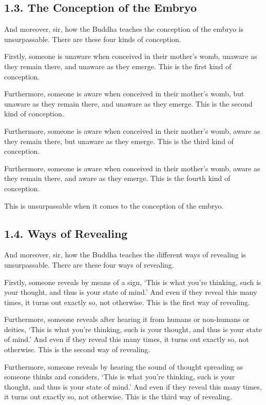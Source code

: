 \documentclass[12pt,openany]{book}%
\begin{document}
\subsection*{1.3. The Conception of the Embryo }

And moreover, sir, how the Buddha teaches the conception of the embryo is unsurpassable. There are these four kinds of conception. 

Firstly, someone is unaware when conceived in their mother’s womb, unaware as they remain there, and unaware as they emerge. This is the first kind of conception. 

Furthermore, someone is aware when conceived in their mother’s womb, but unaware as they remain there, and unaware as they emerge. This is the second kind of conception. 

Furthermore, someone is aware when conceived in their mother’s womb, aware as they remain there, but unaware as they emerge. This is the third kind of conception. 

Furthermore, someone is aware when conceived in their mother’s womb, aware as they remain there, and aware as they emerge. This is the fourth kind of conception. 

This is unsurpassable when it comes to the conception of the embryo. 

\subsection*{1.4. Ways of Revealing }

And moreover, sir, how the Buddha teaches the different ways of revealing is unsurpassable. There are these four ways of revealing. 

Firstly, someone reveals by means of a sign, ‘This is what you’re thinking, such is your thought, and thus is your state of mind.’ And even if they reveal this many times, it turns out exactly so, not otherwise. This is the first way of revealing. 

Furthermore, someone reveals after hearing it from humans or non-humans or deities, ‘This is what you’re thinking, such is your thought, and thus is your state of mind.’ And even if they reveal this many times, it turns out exactly so, not otherwise. This is the second way of revealing. 

Furthermore, someone reveals by hearing the sound of thought spreading as someone thinks and considers, ‘This is what you’re thinking, such is your thought, and thus is your state of mind.’ And even if they reveal this many times, it turns out exactly so, not otherwise. This is the third way of revealing. 
\end{document}
